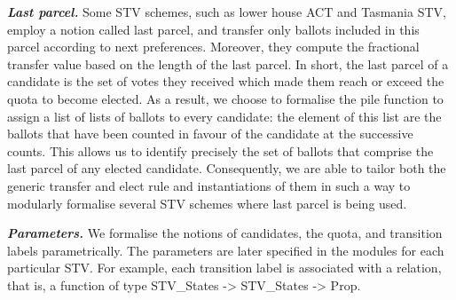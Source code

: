 \documentclass{llncs}
\begin{document}
\textbf{\emph{Last parcel.}} Some STV schemes, such as lower house ACT
and Tasmania STV, employ a notion called last parcel, and transfer
only ballots included in this parcel according to next
preferences. Moreover, they compute the fractional transfer value
based on the length of the last parcel. In short, the last parcel of a
candidate is the set of votes they received which made them reach or
exceed the quota to become elected. As a result, we choose to
formalise the pile function to assign a list of lists of ballots to
every candidate: the element of this list are the ballots that have
been counted in favour of the candidate at the successive counts.
This allows us to identify precisely the set of ballots that
comprise the last parcel of any elected candidate. Consequently, we
are able to tailor both the generic transfer and elect rule and
instantiations of them in such a way to modularly formalise several
STV schemes where last parcel is being used.


\textbf{\emph{Parameters.}} 
We formalise the notions of candidates, the quota, and transition
labels parametrically. The parameters are later specified in the
modules for each particular STV. For example, each transition label
is associated with a relation, that is, a function of type {\selectfont STV\_States -> STV\_States -> Prop}.  
\end{document}
